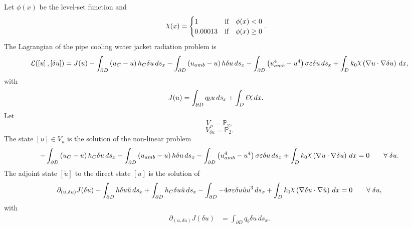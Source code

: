 \documentclass[preview]{standalone}
\let\oldcdot\cdot
\let\cdot\oldcdot
\begin{document}
Let $\phi(x)$ be the level-set function and
 \begin{align*}\raisebox{\depth}{$\chi$}(x) &= \begin{cases} 1 & \mbox{if}\quad \phi(x) < 0 \\ 0.00013 & \mbox{if}\quad \phi(x)  \ge 0 \end{cases}.\end{align*}
The Lagrangian of the pipe cooling water jacket radiation problem is
\begin{dmath*}
\mathcal L(\left[ u\right],\left[ \delta u\right]) = J(u) -  \int_{\partial D} \left(u_{C} - u\right) h_{C} \delta u \,ds_x -  \int_{\partial D} \left(u_{amb} - u\right) h \delta u \,ds_x -  \int_{\partial D} \left(u_{amb}^{4} - u^{4}\right) \sigma \varepsilon \delta u \,ds_x +  \int_{D} k_{0} \raisebox{\depth}{$\chi$} \left(  \nabla u  \cdot  \nabla \delta u  \right) \,dx , 
\end{dmath*}
with 
\begin{align*}
J(u) &=  \int_{\partial D} q_{b} u \,ds_x +  \int_{D} \ell \raisebox{\depth}{$\chi$} \,dx.
 \end{align*}
Let
\begin{equation*}
V_{u} = \mathbb P_{2},\end{equation*}
\begin{equation*}
V_{\delta u} = \mathbb P_{2}.\end{equation*}
The state $\left[ u\right] \in  V_{u}$ is the solution of the non-linear problem
\begin{dmath*}
-  \int_{\partial D} \left(u_{C} - u\right) h_{C} \delta u \,ds_x -  \int_{\partial D} \left(u_{amb} - u\right) h \delta u \,ds_x -  \int_{\partial D} \left(u_{amb}^{4} - u^{4}\right) \sigma \varepsilon \delta u \,ds_x +  \int_{D} k_{0} \raisebox{\depth}{$\chi$} \left(  \nabla u  \cdot  \nabla \delta u  \right) \,dx = 0\qquad \forall\; \delta u . 
\end{dmath*}
The adjoint state $\left[ \tilde u\right]$ to the direct state $\left[ u\right]$ is the solution of
\begin{dmath*}
\partial_{(u,\delta u)} J(\delta u) +  \int_{\partial D} h \delta u \tilde u \,ds_x +  \int_{\partial D} h_{C} \delta u \tilde u \,ds_x -  \int_{\partial D} - 4 \sigma \varepsilon \delta u \tilde u u^{3} \,ds_x +  \int_{D} k_{0} \raisebox{\depth}{$\chi$} \left(  \nabla \delta u  \cdot  \nabla \tilde u  \right) \,dx = 0\qquad \forall\; \delta u , 
\end{dmath*}
with 
\begin{align*}
\partial_{(u,\delta u)} J(\delta u) &=  \int_{\partial D} q_{b} \delta u \,ds_x.
 \end{align*}
\end{document}
